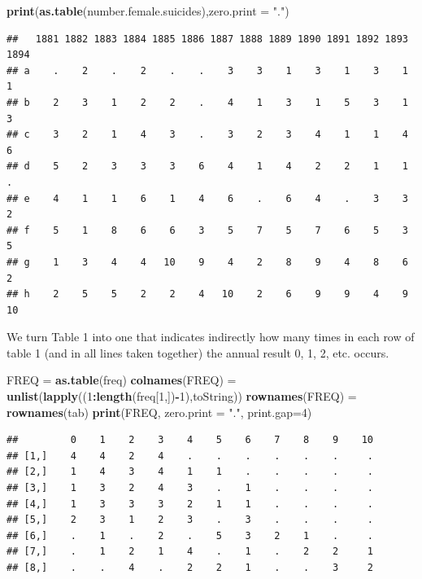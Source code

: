 \documentclass[]{book}
\newenvironment{Shaded}{\begin{snugshade}}{\end{snugshade}}
\newcommand{\DataTypeTok}[1]{\textcolor[rgb]{0.13,0.29,0.53}{#1}}
\newcommand{\DecValTok}[1]{\textcolor[rgb]{0.00,0.00,0.81}{#1}}
\newcommand{\KeywordTok}[1]{\textcolor[rgb]{0.13,0.29,0.53}{\textbf{#1}}}
\newcommand{\NormalTok}[1]{#1}
\newcommand{\OperatorTok}[1]{\textcolor[rgb]{0.81,0.36,0.00}{\textbf{#1}}}
\newcommand{\StringTok}[1]{\textcolor[rgb]{0.31,0.60,0.02}{#1}}
\begin{document}
\begin{Shaded}
\begin{Highlighting}[]
\KeywordTok{print}\NormalTok{(}\KeywordTok{as.table}\NormalTok{(number.female.suicides),}\DataTypeTok{zero.print =} \StringTok{"."}\NormalTok{)}
\end{Highlighting}
\end{Shaded}

\begin{verbatim}
##   1881 1882 1883 1884 1885 1886 1887 1888 1889 1890 1891 1892 1893 1894
## a    .    2    .    2    .    .    3    3    1    3    1    3    1    1
## b    2    3    1    2    2    .    4    1    3    1    5    3    1    3
## c    3    2    1    4    3    .    3    2    3    4    1    1    4    6
## d    5    2    3    3    3    6    4    1    4    2    2    1    1    .
## e    4    1    1    6    1    4    6    .    6    4    .    3    3    2
## f    5    1    8    6    6    3    5    7    5    7    6    5    3    5
## g    1    3    4    4   10    9    4    2    8    9    4    8    6    2
## h    2    5    5    2    2    4   10    2    6    9    9    4    9   10
\end{verbatim}

We turn Table 1 into one that indicates indirectly how many times in each row of table 1 (and in all lines taken together) the annual result 0, 1, 2, etc.
occurs.

\begin{Shaded}
\begin{Highlighting}[]
\NormalTok{FREQ =}\StringTok{ }\KeywordTok{as.table}\NormalTok{(freq)}
\KeywordTok{colnames}\NormalTok{(FREQ) =}\StringTok{ }\KeywordTok{unlist}\NormalTok{(}\KeywordTok{lapply}\NormalTok{((}\DecValTok{1}\OperatorTok{:}\KeywordTok{length}\NormalTok{(freq[}\DecValTok{1}\NormalTok{,])}\OperatorTok{-}\DecValTok{1}\NormalTok{),toString))}
\KeywordTok{rownames}\NormalTok{(FREQ) =}\StringTok{ }\KeywordTok{rownames}\NormalTok{(tab) }
\KeywordTok{print}\NormalTok{(FREQ, }\DataTypeTok{zero.print =} \StringTok{"."}\NormalTok{, }\DataTypeTok{print.gap=}\DecValTok{4}\NormalTok{)}
\end{Highlighting}
\end{Shaded}

\begin{verbatim}
##         0    1    2    3    4    5    6    7    8    9    10
## [1,]    4    4    2    4    .    .    .    .    .    .     .
## [2,]    1    4    3    4    1    1    .    .    .    .     .
## [3,]    1    3    2    4    3    .    1    .    .    .     .
## [4,]    1    3    3    3    2    1    1    .    .    .     .
## [5,]    2    3    1    2    3    .    3    .    .    .     .
## [6,]    .    1    .    2    .    5    3    2    1    .     .
## [7,]    .    1    2    1    4    .    1    .    2    2     1
## [8,]    .    .    4    .    2    2    1    .    .    3     2
\end{verbatim}
\end{document}
